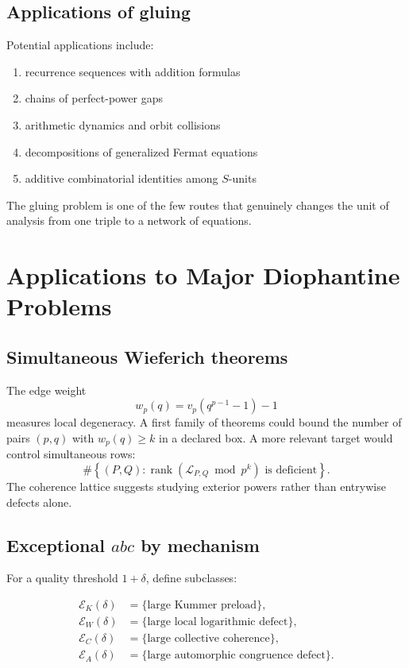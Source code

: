 \section{Applications of gluing}
Potential applications include:

\begin{enumerate}[leftmargin=1.5em]
\item recurrence sequences with addition formulas
\item chains of perfect-power gaps
\item arithmetic dynamics and orbit collisions
\item decompositions of generalized Fermat equations
\item additive combinatorial identities among $S$-units
\end{enumerate}

The gluing problem is one of the few routes that genuinely changes the unit of analysis from one triple to a network of equations.

\chapter{Applications to Major Diophantine Problems}

\section{Simultaneous Wieferich theorems}
The edge weight
\[
 w_p(q)=v_p(q^{p-1}-1)-1
\]
measures local degeneracy. A first family of theorems could bound the number of pairs $(p,q)$ with $w_p(q)\ge k$ in a declared box. A more relevant target would control simultaneous rows:
\[
 \#\left\{
 (P,Q):
 \operatorname{rank}(\mathcal L_{P,Q}\bmod p^k)
 \text{ is deficient}
 \right\}.
\]
The coherence lattice suggests studying exterior powers rather than entrywise defects alone.

\section{Exceptional \texorpdfstring{$abc$}{abc} by mechanism}
For a quality threshold $1+\delta$, define subclasses:

\begin{align*}
 \mathcal E_K(\delta)&=\{\text{large Kummer preload}\},\\
 \mathcal E_W(\delta)&=\{\text{large local logarithmic defect}\},\\
 \mathcal E_C(\delta)&=\{\text{large collective coherence}\},\\
 \mathcal E_A(\delta)&=\{\text{large automorphic congruence defect}\}.
\end{align*}

